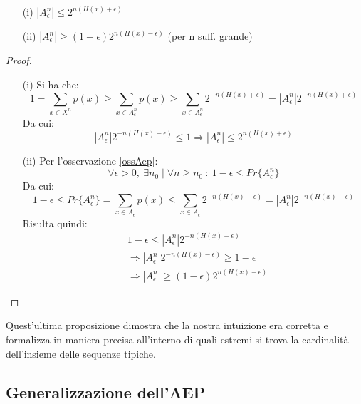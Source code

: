 \begin{proposizione}
 \mbox{}
 \begin{itemize}
  \item[(i)] $ |A_{\epsilon}^n| \le 2^{n(H(x)+\epsilon)}$
 
  \item[(ii)] $|A_{\epsilon}^n| \ge (1-\epsilon) 2^{n(H(x)-\epsilon)}$  (per n suff. grande)
 \end{itemize}
 \begin{proof}
  \mbox{}
  \begin{itemize}
   \item[(i)] Si ha che:
   \[
    1=\sum_{x \in X^n} p(x) \ge \sum_{x \in A_{\epsilon}^n} p(x) \ge 
      \sum_{x \in A_{\epsilon}^n} 2^{-n(H(x)+ \epsilon)}=|A_{\epsilon}^n| 2^{-n(H(x)+ \epsilon)} 
   \]
   Da cui:
   \[
    |A_{\epsilon}^n| 2^{-n(H(x)+ \epsilon)} \le 1 \Rightarrow |A_{\epsilon}^n| \le 2^{n(H(x)+ \epsilon)}
   \]


   \item[(ii)]
   Per l'osservazione \ref{ossAep}:
   \[
    \forall \epsilon > 0, \ \exists n_0 \mid \forall n \ge n_0 \ : \ 1 - \epsilon \le Pr\{A_{\epsilon}^n\}
   \]
   Da cui:
   \[
    1 - \epsilon \le Pr\{A_{\epsilon}^n\}=\sum_{x \in A_{\epsilon}} p(x) \le 
    \sum_{x \in A_{\epsilon}} 2^{-n(H(x)-\epsilon)} = |A_{\epsilon}^n| 2^{-n(H(x)-\epsilon)}
   \]
   Risulta quindi:
   \[\begin{split}
    & 1 - \epsilon \le |A_{\epsilon}^n| 2^{-n(H(x)-\epsilon)}  \\
    & \Rightarrow |A_{\epsilon}^n| 2^{-n(H(x)-\epsilon)}  \ge 1 - \epsilon \\
    &\Rightarrow |A_{\epsilon}^n| \ge (1 - \epsilon) 2^{n(H(x)-\epsilon)}
    \end{split}
   \]

  \end{itemize}

 \end{proof}

\end{proposizione}

Quest'ultima proposizione dimostra che la nostra intuizione era corretta e formalizza in maniera precisa all'interno 
di quali estremi si trova la cardinalità dell'insieme delle sequenze tipiche.

\subsection{Generalizzazione dell'AEP}

